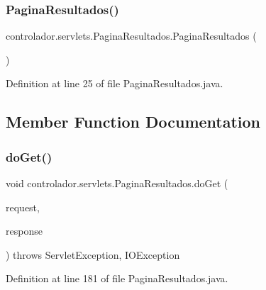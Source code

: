 \subsubsection{\texorpdfstring{Pagina\+Resultados()}{PaginaResultados()}}
{\footnotesize\ttfamily controlador.\+servlets.\+Pagina\+Resultados.\+Pagina\+Resultados (\begin{DoxyParamCaption}{ }\end{DoxyParamCaption})}



Definition at line 25 of file Pagina\+Resultados.\+java.



\subsection{Member Function Documentation}
\hypertarget{classcontrolador_1_1servlets_1_1PaginaResultados_ab54c05fe6b07175f62c8902d3a58f885}{}\label{classcontrolador_1_1servlets_1_1PaginaResultados_ab54c05fe6b07175f62c8902d3a58f885} 
\subsubsection{\texorpdfstring{do\+Get()}{doGet()}}
{\footnotesize\ttfamily void controlador.\+servlets.\+Pagina\+Resultados.\+do\+Get (\begin{DoxyParamCaption}\item[{Http\+Servlet\+Request}]{request,  }\item[{Http\+Servlet\+Response}]{response }\end{DoxyParamCaption}) throws Servlet\+Exception, I\+O\+Exception\hspace{0.3cm}{\ttfamily [protected]}}



Definition at line 181 of file Pagina\+Resultados.\+java.

\hypertarget{classcontrolador_1_1servlets_1_1PaginaResultados_ac65f808df4a17b2e3f1cc36d8b5f69cd}{}\label{classcontrolador_1_1servlets_1_1PaginaResultados_ac65f808df4a17b2e3f1cc36d8b5f69cd} 
